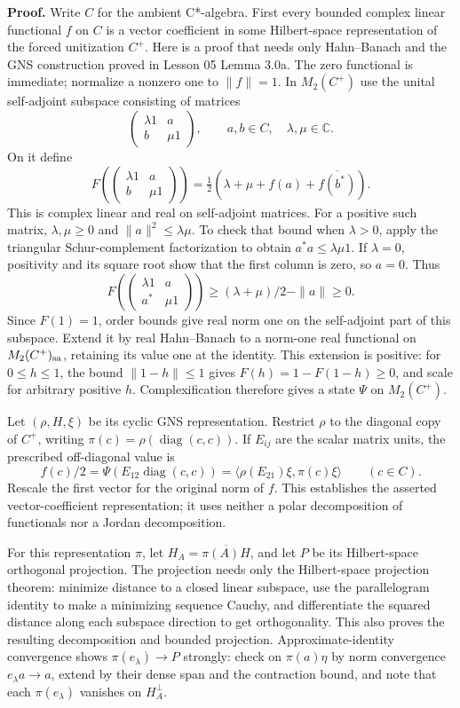 \documentclass[
  11pt,
]{article}
\begin{document}
\textbf{Proof.} Write \(C\) for the ambient C*-algebra. First every
bounded complex linear functional \(f\) on \(C\) is a vector coefficient
in some Hilbert-space representation of the forced unitization \(C^+\).
Here is a proof that needs only Hahn--Banach and the GNS construction
proved in Lesson 05 Lemma 3.0a. The zero functional is immediate;
normalize a nonzero one to \(\|f\|=1\). In \(M_2(C^+)\) use the unital
self-adjoint subspace consisting of matrices \[
\begin{pmatrix}\lambda1&a\\b&\mu1\end{pmatrix},
\qquad a,b\in C,\quad\lambda,\mu\in\mathbb C.
\] On it define \[
F\left(\begin{pmatrix}\lambda1&a\\b&\mu1\end{pmatrix}\right)
=\tfrac12(\lambda+\mu+f(a)+\overline{f(b^*)}).
\] This is complex linear and real on self-adjoint matrices. For a
positive such matrix, \(\lambda,\mu\geq0\) and
\(\|a\|^2\leq\lambda\mu\). To check that bound when \(\lambda>0\), apply
the triangular Schur-complement factorization to obtain
\(a^*a\leq\lambda\mu1\). If \(\lambda=0\), positivity and its square
root show that the first column is zero, so \(a=0\). Thus \[
F\left(\begin{pmatrix}\lambda1&a\\a^*&\mu1\end{pmatrix}\right)
\geq(\lambda+\mu)/2-\|a\|\geq0.
\] Since \(F(1)=1\), order bounds give real norm one on the self-adjoint
part of this subspace. Extend it by real Hahn--Banach to a norm-one real
functional on \(M_2(C^+)_{\rm sa}\), retaining its value one at the
identity. This extension is positive: for \(0\leq h\leq1\), the bound
\(\|1-h\|\leq1\) gives \(F(h)=1-F(1-h)\geq0\), and scale for arbitrary
positive \(h\). Complexification therefore gives a state \(\Psi\) on
\(M_2(C^+)\).

Let \((\rho,H,\xi)\) be its cyclic GNS representation. Restrict \(\rho\)
to the diagonal copy of \(C^+\), writing
\(\pi(c)=\rho(\operatorname{diag}(c,c))\). If \(E_{ij}\) are the scalar
matrix units, the prescribed off-diagonal value is \[
f(c)/2=\Psi(E_{12}\operatorname{diag}(c,c))
=\langle\rho(E_{21})\xi,\pi(c)\xi\rangle\qquad(c\in C).
\] Rescale the first vector for the original norm of \(f\). This
establishes the asserted vector-coefficient representation; it uses
neither a polar decomposition of functionals nor a Jordan decomposition.

For this representation \(\pi\), let \(H_A=\overline{\pi(A)H}\), and let
\(P\) be its Hilbert-space orthogonal projection. The projection needs
only the Hilbert-space projection theorem: minimize distance to a closed
linear subspace, use the parallelogram identity to make a minimizing
sequence Cauchy, and differentiate the squared distance along each
subspace direction to get orthogonality. This also proves the resulting
decomposition and bounded projection. Approximate-identity convergence
shows \(\pi(e_\lambda)\to P\) strongly: check on \(\pi(a)\eta\) by norm
convergence \(e_\lambda a\to a\), extend by their dense span and the
contraction bound, and note that each \(\pi(e_\lambda)\) vanishes on
\(H_A^\perp\).
\end{document}
